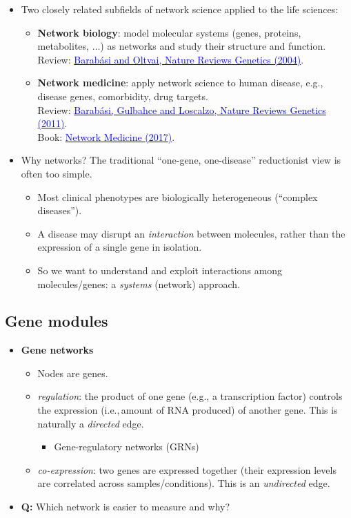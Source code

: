 \documentclass[20pt]{extarticle}
\newcommand{\hrefc}[2]{\href{#1}{\textcolor{blue}{#2}}}
\begin{document}
\begin{itemize}
\item Two closely related subfields of network science applied to the life sciences:
	\begin{itemize}
	\item \textbf{Network biology}: model molecular systems (genes, proteins, metabolites, $\ldots$) as networks and study their structure and function.\\
	Review: \hrefc{https://doi.org/10.1038/nrg1272}{Barab\'asi and Oltvai, Nature Reviews Genetics (2004)}.
	\item \textbf{Network medicine}: apply network science to human disease, e.g., disease genes, comorbidity, drug targets.\\
	Review: \hrefc{https://doi.org/10.1038/nrg2918}{Barab\'asi, Gulbahce and Loscalzo, Nature Reviews Genetics (2011)}.\\
	Book: \hrefc{https://www.hup.harvard.edu/books/9780674436534}{Network Medicine (2017)}.
	\end{itemize}
\item Why networks? The traditional ``one-gene, one-disease'' reductionist view is often too simple.
	\begin{itemize}
	\item Most clinical phenotypes are biologically heterogeneous (``complex diseases'').
	\item A disease may disrupt an \emph{interaction} between molecules, rather than the expression of a single gene in isolation.
	\item So we want to understand and exploit interactions among molecules/genes: a \emph{systems} (network) approach.
	\end{itemize}
\end{itemize}

\subsection*{Gene modules}

\begin{itemize}
\item \textbf{Gene networks}
	\begin{itemize}
	\item Nodes are genes.
	\item \emph{regulation}: the product of one gene (e.g., a transcription factor) controls the expression (i.e.,\,amount of RNA produced) of another gene. This is naturally a \emph{directed} edge.
		\begin{itemize}
		\item Gene-regulatory networks (GRNs)
		\end{itemize}
	\item \emph{co-expression}: two genes are expressed together (their expression levels are correlated across samples/conditions). This is an \emph{undirected} edge.
	\end{itemize}
	\item \textbf{Q:} Which network is easier to measure and why?
\end{itemize}
\end{document}
